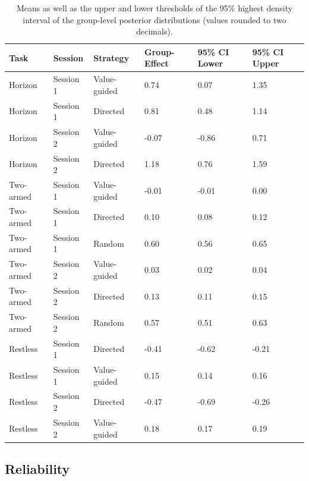\documentclass[fleqn,10pt]{wlscirep}
\begin{document}
\begin{table}[ht]
\centering
\begin{tabular}{|l|l|l|l|l|l|}
\hline
\textbf{Task} & \textbf{Session} & \textbf{Strategy} & \textbf{Group-Effect} & \textbf{95\% CI Lower} & \textbf{95\% CI Upper} \\ \hline
Horizon & Session 1 & Value-guided & 0.74 & 0.07 & 1.35 \\ \hline
Horizon & Session 1 & Directed & 0.81 & 0.48 & 1.14 \\ \hline
Horizon & Session 2 & Value-guided & -0.07 & -0.86 & 0.71 \\ \hline
Horizon & Session 2 & Directed & 1.18 & 0.76 & 1.59 \\ \hline
Two-armed & Session 1 & Value-guided & -0.01 & -0.01 & 0.00 \\ \hline
Two-armed & Session 1 & Directed & 0.10 & 0.08 & 0.12 \\ \hline
Two-armed & Session 1 & Random & 0.60 & 0.56 & 0.65 \\ \hline
Two-armed & Session 2 & Value-guided & 0.03 & 0.02 & 0.04 \\ \hline
Two-armed & Session 2 & Directed & 0.13 & 0.11 & 0.15 \\ \hline
Two-armed & Session 2 & Random & 0.57 & 0.51 & 0.63 \\ \hline
Restless & Session 1 & Directed & -0.41 & -0.62 & -0.21 \\ \hline
Restless & Session 1 & Value-guided & 0.15 & 0.14 & 0.16 \\ \hline
Restless & Session 2 & Directed & -0.47 & -0.69 & -0.26 \\ \hline
Restless & Session 2 & Value-guided & 0.18 & 0.17 & 0.19 \\ \hline
\end{tabular}
\caption{Means as well as the upper and lower thresholds of the 95\% highest density interval of the group-level posterior distributions (values rounded to two decimals).}
\label{tab:group-effects-original-rounded}
\end{table}



\subsection*{Reliability} 
\end{document}
